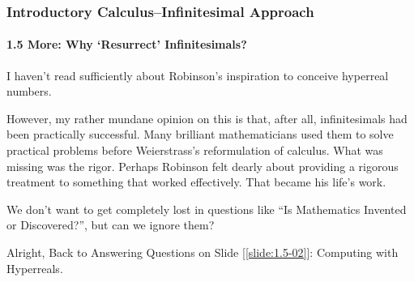 
\begin{frame}
\frametitle{Introductory Calculus--Infinitesimal Approach}
\framesubtitle{1.5 More: Why `Resurrect' Infinitesimals?}
\label{slide:1.5-04}
I haven't read sufficiently about Robinson's inspiration to conceive hyperreal numbers. 

However, my rather mundane opinion on this is that, after all, infinitesimals had been practically successful. Many brilliant mathematicians used them to solve practical problems before Weierstrass's reformulation of calculus. What was missing was the rigor. Perhaps Robinson felt dearly about providing a rigorous treatment to something that worked effectively. That became his life's work.

We don't want to get completely lost in questions like ``Is Mathematics Invented or Discovered?'', but can we ignore them?

\alert{Alright, Back to Answering Questions on Slide [\ref{slide:1.5-02}]: Computing with Hyperreals}.
\end{frame}
